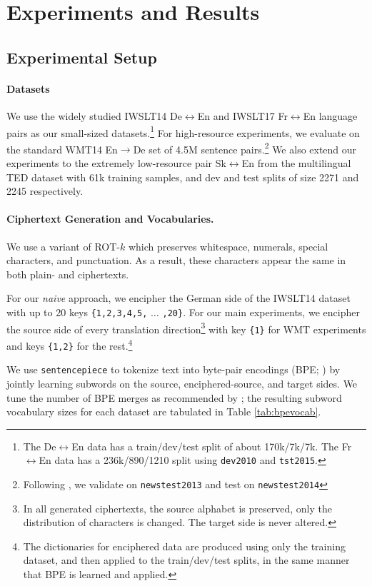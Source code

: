 \documentclass[11pt]{article}
\begin{document}
\section{Experiments and Results}
\subsection{Experimental Setup}
\paragraph{Datasets} 
We use the widely studied IWSLT14 De$\leftrightarrow$En and IWSLT17 Fr$\leftrightarrow$En language pairs as our small-sized datasets.\footnote{The De$\leftrightarrow$En data has a train/dev/test split of about 170k/7k/7k. The Fr$\leftrightarrow$En data has a 236k/890/1210 split using \texttt{dev2010} and \texttt{tst2015}.}
For high-resource experiments, we evaluate on the standard WMT14 En$\rightarrow$De set of 4.5M sentence pairs.\footnote{Following \citet{vaswani2017attention}, we validate on \texttt{newstest2013} and test on \texttt{newstest2014}} 
We also extend our experiments to the extremely low-resource pair Sk$\leftrightarrow$En from the multilingual TED dataset \cite{qi-etal-2018-pre} with 61k training samples, and dev and test splits of size 2271 and 2245 respectively.

\paragraph{Ciphertext Generation and Vocabularies.} \label{sec:vocabs}
We use a variant of ROT-$k$ which preserves whitespace, numerals, special characters, and punctuation. 
As a result, these characters appear the same in both plain- and ciphertexts.

For our \emph{naive} approach, we encipher the German side of the IWSLT14 dataset with up to 20 keys \texttt{\{1,2,3,4,5,} $\ldots$ \texttt{,20\}}. For our main experiments, we encipher the source side of every translation direction\footnote{In all generated ciphertexts, the source alphabet is preserved, only the distribution of characters is changed. The target side is never altered.} with key \texttt{\{1\}} for WMT experiments and keys \texttt{\{1,2\}} for the rest.\footnote{The dictionaries for enciphered data are produced using only the training dataset, and then applied to the train/dev/test splits, in the same manner that BPE is learned and applied.}

We use \texttt{sentencepiece} \cite{kudo-richardson-2018-sentencepiece} to tokenize text into byte-pair encodings (BPE; \citealt{sennrich-etal-2016-neural}) by jointly learning subwords on the source, enciphered-source, and target sides.  
We tune the number of BPE merges as recommended by \citet{ding-etal-2019-call}; the resulting subword vocabulary sizes for each dataset are tabulated in Table \ref{tab:bpevocab}.
\end{document}
